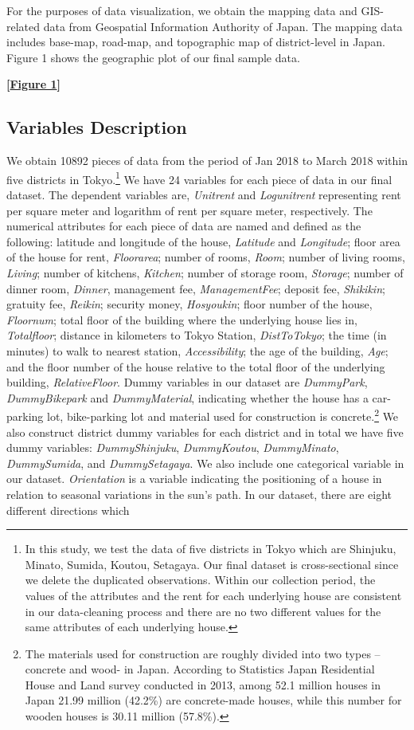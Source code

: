 \documentclass[a4paper, 12pt]{article} %
\newcommand{\var}[1][\textit]{#1}
\begin{document}
For the purposes of data visualization, we obtain the mapping data and GIS-related data from Geospatial Information Authority of Japan. The mapping data includes base-map, road-map, and topographic map of district-level in Japan. Figure 1 shows the geographic plot of our final sample data.

\bigskip
 \centerline{\bf [\hyperref[fig1]{Figure 1}]}
\bigskip

\subsection{Variables Description}
\label{sec32}
We obtain 10892 pieces of data from the period of Jan 2018 to March 2018 within five districts in Tokyo.\footnote{In this study, we test the data of five districts in Tokyo which are Shinjuku, Minato, Sumida, Koutou, Setagaya. Our final dataset is cross-sectional since we delete the duplicated observations. Within our collection period, the values of the attributes and the rent for each underlying house are consistent in our data-cleaning process and there are no two different values for the same attributes of each underlying house.} We have 24 variables for each piece of data in our final dataset. The dependent variables are, \var{Unitrent} and \var{Logunitrent} representing rent per square meter and logarithm of rent per square meter, respectively. The numerical attributes for each piece of data are named and defined as the following: latitude and longitude of the house, \var{Latitude} and \var{Longitude}; floor area of the house for rent, \var{Floorarea}; number of rooms, \var{Room}; number of living rooms, \var{Living}; number of kitchens, \var{Kitchen}; number of storage room, \var{Storage}; number of dinner room, \var{Dinner}, management fee, \var{ManagementFee}; deposit fee, \var{Shikikin}; gratuity fee, \var{Reikin}; security money, \var{Hosyoukin}; floor number of the house, \var{Floornum}; total floor of the building where the underlying house lies in, \var{Totalfloor}; distance in kilometers to Tokyo Station, \var{DistToTokyo}; the time (in minutes) to walk to nearest station, \var{Accessibility}; the age of the building, \var{Age}; and the floor number of the house relative to the total floor of the underlying building, \var{RelativeFloor}. Dummy variables in our dataset are \var{DummyPark}, \var{DummyBikepark} and \var{DummyMaterial}, indicating whether the house has a car-parking lot, bike-parking lot and material used for construction is concrete.\footnote{The materials used for construction are roughly divided into two types – concrete and wood- in Japan. According to Statistics Japan Residential House and Land survey conducted in 2013, among 52.1 million houses in Japan 21.99 million (42.2\%) are concrete-made houses, while this number for wooden houses is 30.11 million (57.8\%).} We also construct district dummy variables for each district and in total we have five dummy variables: \var{DummyShinjuku}, \var{DummyKoutou}, \var{DummyMinato}, \var{DummySumida}, and \var{DummySetagaya}. We also include one categorical variable in our dataset. \var{Orientation} is a variable indicating the positioning of a house in relation to seasonal variations in the sun's path. In our dataset, there are eight different directions which 
\end{document}
